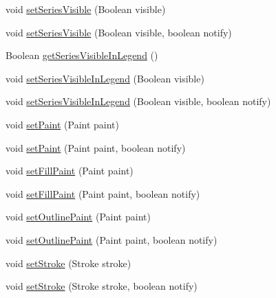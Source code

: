 \begin{DoxyCompactItemize}
void \mbox{\hyperlink{classorg_1_1jfree_1_1chart_1_1renderer_1_1_abstract_renderer_a0d8478845dba91f92a5d6b5d3b97b0d1}{set\+Series\+Visible}} (Boolean visible)
\item 
void \mbox{\hyperlink{classorg_1_1jfree_1_1chart_1_1renderer_1_1_abstract_renderer_afddfe439a293eb3b540ea13be1839fea}{set\+Series\+Visible}} (Boolean visible, boolean notify)
\item 
Boolean \mbox{\hyperlink{classorg_1_1jfree_1_1chart_1_1renderer_1_1_abstract_renderer_afa4d326cb72c09bce35c28534efd7ec0}{get\+Series\+Visible\+In\+Legend}} ()
\item 
void \mbox{\hyperlink{classorg_1_1jfree_1_1chart_1_1renderer_1_1_abstract_renderer_a8c0dfdb91884e49115d07e762d2d2594}{set\+Series\+Visible\+In\+Legend}} (Boolean visible)
\item 
void \mbox{\hyperlink{classorg_1_1jfree_1_1chart_1_1renderer_1_1_abstract_renderer_a673f84a46a327d3d343944e59602f6ca}{set\+Series\+Visible\+In\+Legend}} (Boolean visible, boolean notify)
\item 
void \mbox{\hyperlink{classorg_1_1jfree_1_1chart_1_1renderer_1_1_abstract_renderer_ad01b6bfce0066f4bbfd699c22aff7c88}{set\+Paint}} (Paint paint)
\item 
void \mbox{\hyperlink{classorg_1_1jfree_1_1chart_1_1renderer_1_1_abstract_renderer_a0b70f8247a421f9e81462bd49972b790}{set\+Paint}} (Paint paint, boolean notify)
\item 
void \mbox{\hyperlink{classorg_1_1jfree_1_1chart_1_1renderer_1_1_abstract_renderer_af96e4cf14baee347449226a6648a4324}{set\+Fill\+Paint}} (Paint paint)
\item 
void \mbox{\hyperlink{classorg_1_1jfree_1_1chart_1_1renderer_1_1_abstract_renderer_aa56f671cc087febb27c2fabf7ffede10}{set\+Fill\+Paint}} (Paint paint, boolean notify)
\item 
void \mbox{\hyperlink{classorg_1_1jfree_1_1chart_1_1renderer_1_1_abstract_renderer_af12d47fe216d03827398ea257e11b8b3}{set\+Outline\+Paint}} (Paint paint)
\item 
void \mbox{\hyperlink{classorg_1_1jfree_1_1chart_1_1renderer_1_1_abstract_renderer_a4e71d05784d1a3e4cbc2d7498f0383fd}{set\+Outline\+Paint}} (Paint paint, boolean notify)
\item 
void \mbox{\hyperlink{classorg_1_1jfree_1_1chart_1_1renderer_1_1_abstract_renderer_ae1a46d8ef2f30774ca1e67f7c0fe1372}{set\+Stroke}} (Stroke stroke)
\item 
void \mbox{\hyperlink{classorg_1_1jfree_1_1chart_1_1renderer_1_1_abstract_renderer_a25c9ae10446e8574ea8667b18e8cdae4}{set\+Stroke}} (Stroke stroke, boolean notify)

\end{DoxyCompactItemize}
